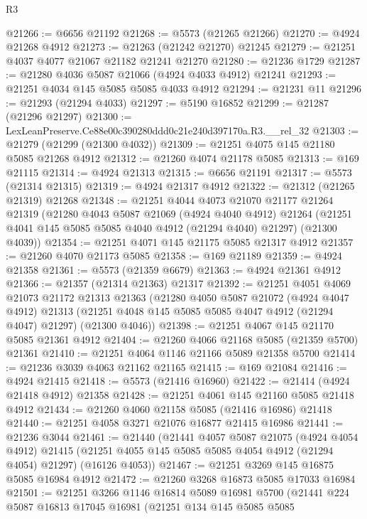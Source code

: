 \begin{lexlean}{R3}
\begin{coremodule}
@21266 := @6656 @21192
@21268 := @5573 (@21265 @21266)
@21270 := @4924 @21268 @4912
@21273 := @21263 (@21242 @21270) @21245
@21279 := @21251 @4037 @4077 @21067 @21182 @21241 @21270
@21280 := @21236 @1729
@21287 := @21280 @4036 @5087 @21066 (@4924 @4033 @4912) @21241
@21293 := @21251 @4034 @145 @5085 @5085 @4033 @4912
@21294 := @21231 @11
@21296 := @21293 (@21294 @4033)
@21297 := @5190 @16852
@21299 := @21287 (@21296 @21297)
@21300 := LexLeanPreserve.Ce88e00c390280ddd0c21e240d397170a.R3.__rel_32
@21303 := @21279 (@21299 (@21300 @4032))
@21309 := @21251 @4075 @145 @21180 @5085 @21268 @4912
@21312 := @21260 @4074 @21178 @5085
@21313 := @169 @21115
@21314 := @4924 @21313
@21315 := @6656 @21191
@21317 := @5573 (@21314 @21315)
@21319 := @4924 @21317 @4912
@21322 := @21312 (@21265 @21319) @21268
@21348 := @21251
    @4044
    @4073
    @21070
    @21177
    @21264
    @21319
    (@21280
      @4043
      @5087
      @21069
      (@4924 @4040 @4912)
      @21264
      (@21251 @4041 @145 @5085 @5085 @4040 @4912 (@21294 @4040) @21297)
      (@21300 @4039))
@21354 := @21251 @4071 @145 @21175 @5085 @21317 @4912
@21357 := @21260 @4070 @21173 @5085
@21358 := @169 @21189
@21359 := @4924 @21358
@21361 := @5573 (@21359 @6679)
@21363 := @4924 @21361 @4912
@21366 := @21357 (@21314 @21363) @21317
@21392 := @21251
    @4051
    @4069
    @21073
    @21172
    @21313
    @21363
    (@21280
      @4050
      @5087
      @21072
      (@4924 @4047 @4912)
      @21313
      (@21251 @4048 @145 @5085 @5085 @4047 @4912 (@21294 @4047) @21297)
      (@21300 @4046))
@21398 := @21251 @4067 @145 @21170 @5085 @21361 @4912
@21404 := @21260 @4066 @21168 @5085 (@21359 @5700) @21361
@21410 := @21251 @4064 @1146 @21166 @5089 @21358 @5700
@21414 := @21236 @3039 @4063 @21162 @21165
@21415 := @169 @21084
@21416 := @4924 @21415
@21418 := @5573 (@21416 @16960)
@21422 := @21414 (@4924 @21418 @4912) @21358
@21428 := @21251 @4061 @145 @21160 @5085 @21418 @4912
@21434 := @21260 @4060 @21158 @5085 (@21416 @16986) @21418
@21440 := @21251 @4058 @3271 @21076 @16877 @21415 @16986
@21441 := @21236 @3044
@21461 := @21440
    (@21441
      @4057
      @5087
      @21075
      (@4924 @4054 @4912)
      @21415
      (@21251 @4055 @145 @5085 @5085 @4054 @4912 (@21294 @4054) @21297)
      (@16126 @4053))
@21467 := @21251 @3269 @145 @16875 @5085 @16984 @4912
@21472 := @21260 @3268 @16873 @5085 @17033 @16984
@21501 := @21251
    @3266
    @1146
    @16814
    @5089
    @16981
    @5700
    (@21441
      @224
      @5087
      @16813
      @17045
      @16981
      (@21251
        @134
        @145
        @5085
        @5085

\end{coremodule}
\end{lexlean}
